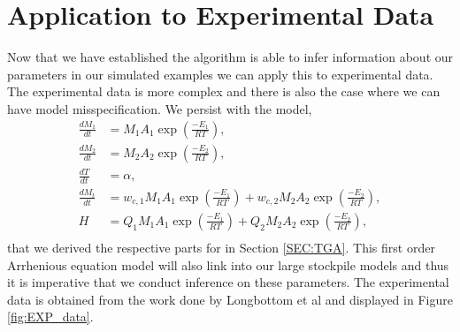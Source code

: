 \section{Application to Experimental Data}
Now that we have established the algorithm is able to infer information about our parameters in our simulated examples we can apply this to experimental data. The experimental data is more complex and there is also the case where we can have model misspecification. We persist with the model,
\begin{align}
\frac{dM_1}{dt}&=M_1A_1\exp\left(\frac{-E_1}{RT}\right),\\
\frac{dM_2}{dt}&=M_2A_2\exp\left(\frac{-E_2}{RT}\right),\\
\frac{dT}{dt}&=\alpha,\\
\frac{dM_t}{dt}&=w_{c,1}M_1A_1\exp\left(\frac{-E_1}{RT}\right)+w_{c,2}M_2A_2\exp\left(\frac{-E_2}{RT}\right), \\
H&=Q_1M_1A_1\exp\left(\frac{-E_1}{RT}\right)+Q_2M_2A_2\exp\left(\frac{-E_2}{RT}\right),\\
\end{align}
that we derived the respective parts for in Section \ref{SEC:TGA}. This first order Arrhenious equation model will also link into our large stockpile models and thus it is imperative that we conduct inference on these parameters. The experimental data is obtained from the work done by Longbottom et al \cite{Ray19} and displayed in Figure \ref{fig:EXP_data}.\\ 

